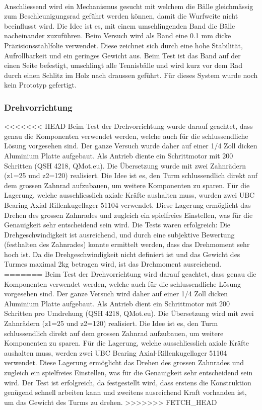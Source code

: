 \noindent
\\Anschliessend wird ein Mechanismus gesucht mit welchem die Bälle 
gleichmässig zum Beschleunigungsrad geführt werden können, damit die Wurfweite 
nicht beeinflusst wird. Die Idee ist es, mit einem umschlingenden Band die 
Bälle nacheinander zuzuführen. Beim Versuch wird als Band eine 0.1 mm dicke 
Präzisionsstahlfolie verwendet. Diese zeichnet sich durch eine hohe Stabilität, 
Aufrollbarkeit und ein geringes Gewicht aus. Beim Test ist das Band auf der 
einen Seite befestigt, umschlingt alle Tennisbälle und wird kurz vor dem Rad 
durch einen Schlitz im Holz nach draussen geführt. Für dieses System wurde noch kein Prototyp gefertigt. \\


\subsubsection{Drehvorrichtung}
<<<<<<< HEAD
Beim Test der Drehvorrichtung wurde darauf geachtet, dass genau die Komponenten verwendet werden, welche auch für die schlussendliche Lösung vorgesehen sind. Der ganze Versuch wurde daher auf einer 1/4 Zoll dicken Aluminium Platte aufgebaut. Als Antrieb diente ein Schrittmotor mit 200 Schritten (QSH 4218, QMot.eu). Die Übersetzung wurde mit zwei Zahnrädern (z1=25 und z2=120) realisiert. Die Idee ist es, den Turm schlussendlich direkt auf dem grossen Zahnrad aufzubauen, um weitere Komponenten zu sparen. Für die Lagerung, welche ausschliesslich axiale Kräfte aushalten muss, wurden zwei UBC Bearing Axial-Rillenkugellager 51104 verwendet. Diese Lagerung ermöglicht das Drehen des grossen Zahnrades und zugleich ein spielfreies Einstellen, was für die Genauigkeit sehr entscheidend sein wird.
Die Tests waren erfolgreich: Die Drehgeschwindigkeit ist ausreichend, und durch eine subjektive Bewertung (festhalten des Zahnrades) konnte ermittelt werden, dass das Drehmoment sehr hoch ist. Da die Drehgeschwindigkeit nicht definiert ist und das Gewicht des Turmes maximal 2kg betragen wird, ist das Drehmoment ausreichend.
=======
Beim Test der Drehvorrichtung wird darauf geachtet, dass genau die Komponenten 
verwendet werden, welche auch für die schlussendliche Lösung vorgesehen sind. 
Der ganze Versuch wird daher auf einer 1/4 Zoll dicken Aluminium Platte 
aufgebaut. Als Antrieb dient ein Schrittmotor mit 200 Schritten pro Umdrehung 
(QSH 4218, QMot.eu). Die Übersetzung wird mit zwei Zahnrädern (z1=25 und z2=120) 
realisiert. Die Idee ist es, den Turm schlussendlich direkt auf dem grossen 
Zahnrad aufzubauen, um weitere Komponenten zu sparen. Für die Lagerung, welche 
ausschliesslich axiale Kräfte aushalten muss, werden zwei UBC Bearing 
Axial-Rillenkugellager 51104 verwendet. Diese Lagerung ermöglicht das Drehen 
des grossen Zahnrades und zugleich ein spielfreies Einstellen, was für die 
Genauigkeit sehr entscheidend sein wird.
Der Test ist erfolgreich, da festgestellt wird, dass erstens die Konstruktion 
genügend schnell arbeiten kann und zweitens ausreichend Kraft vorhanden ist, 
um das Gewicht des Turms zu drehen.
>>>>>>> FETCH_HEAD

